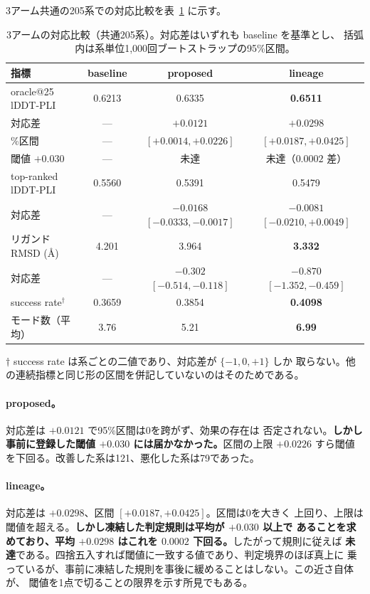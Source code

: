 \documentclass[11pt]{article}
\begin{document}
3アーム共通の205系での対応比較を表~\ref{tab:main} に示す。

\begin{table}[htbp]
\centering
\caption{3アームの対応比較（共通205系）。対応差はいずれも baseline を基準とし、
括弧内は系単位1,000回ブートストラップの95\%区間。}
\label{tab:main}
\begin{tabular}{lccc}
\toprule
指標 & baseline & proposed & lineage \\
\midrule
oracle@25 lDDT-PLI & 0.6213 & 0.6335 & \textbf{0.6511} \\
\quad 対応差 & --- & $+0.0121$ & $+0.0298$ \\
\quad 95\%区間 & --- & $[+0.0014, +0.0226]$ & $[+0.0187, +0.0425]$ \\
\quad 閾値 $+0.030$ & --- & 未達 & 未達（$0.0002$ 差） \\
\midrule
top-ranked lDDT-PLI & 0.5560 & 0.5391 & 0.5479 \\
\quad 対応差 & --- & $-0.0168$ $[-0.0333, -0.0017]$ & $-0.0081$ $[-0.0210, +0.0049]$ \\
\midrule
リガンド RMSD (\AA) & 4.201 & 3.964 & \textbf{3.332} \\
\quad 対応差 & --- & $-0.302$ $[-0.514, -0.118]$ & $-0.870$ $[-1.352, -0.459]$ \\
\midrule
success rate$^{\dagger}$ & 0.3659 & 0.3854 & \textbf{0.4098} \\
モード数（平均） & 3.76 & 5.21 & \textbf{6.99} \\
\bottomrule
\end{tabular}

\vspace{1mm}
{\footnotesize $\dagger$ success rate は系ごとの二値であり、対応差が $\{-1,0,+1\}$ しか
取らない。他の連続指標と同じ形の区間を併記していないのはそのためである。}
\end{table}

\paragraph{proposed。}対応差は $+0.0121$ で95\%区間は0を跨がず、効果の存在は
否定されない。\textbf{しかし事前に登録した閾値 $+0.030$ には届かなかった。}区間の上限
$+0.0226$ すら閾値を下回る。改善した系は121、悪化した系は79であった。

\paragraph{lineage。}対応差は $+0.0298$、区間 $[+0.0187, +0.0425]$。区間は0を大きく
上回り、上限は閾値を超える。\textbf{しかし凍結した判定規則は平均が $+0.030$ 以上で
あることを求めており、平均 $+0.0298$ はこれを $0.0002$ 下回る。}したがって規則に従えば
\textbf{未達}である。四捨五入すれば閾値に一致する値であり、判定境界のほぼ真上に
乗っているが、事前に凍結した規則を事後に緩めることはしない。この近さ自体が、
閾値を1点で切ることの限界を示す所見でもある。
\end{document}
